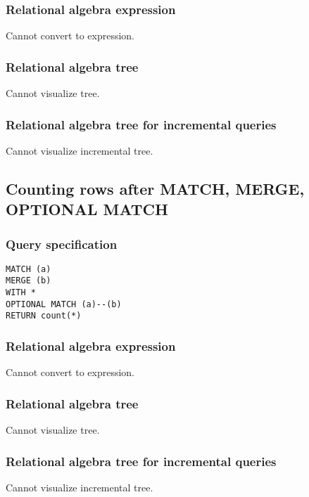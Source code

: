 \subsubsection*{Relational algebra expression}

Cannot convert to expression.

\subsubsection*{Relational algebra tree}

Cannot visualize tree.

\subsubsection*{Relational algebra tree for incremental queries}

Cannot visualize incremental tree.

\subsection{Counting rows after MATCH, MERGE, OPTIONAL MATCH}

\subsubsection*{Query specification}

\begin{lstlisting}
MATCH (a)
MERGE (b)
WITH *
OPTIONAL MATCH (a)--(b)
RETURN count(*)
\end{lstlisting}

\subsubsection*{Relational algebra expression}

Cannot convert to expression.

\subsubsection*{Relational algebra tree}

Cannot visualize tree.

\subsubsection*{Relational algebra tree for incremental queries}

Cannot visualize incremental tree.

